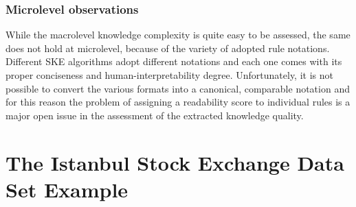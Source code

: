 \documentclass[sigconf]{acmart}
\begin{document}
\subsubsection{Microlevel observations}

While the macrolevel knowledge complexity is quite easy to be assessed, the same does not hold at microlevel, because of the variety of adopted rule notations.
%
Different SKE algorithms adopt different notations and each one comes with its proper conciseness and human-interpretability degree.
%
Unfortunately, it is not possible to convert the various formats into a canonical, comparable notation and for this reason the problem of assigning a readability score to individual rules is a major open issue in the assessment of the extracted knowledge quality.

\section{The Istanbul Stock Exchange Data Set Example}
\end{document}
